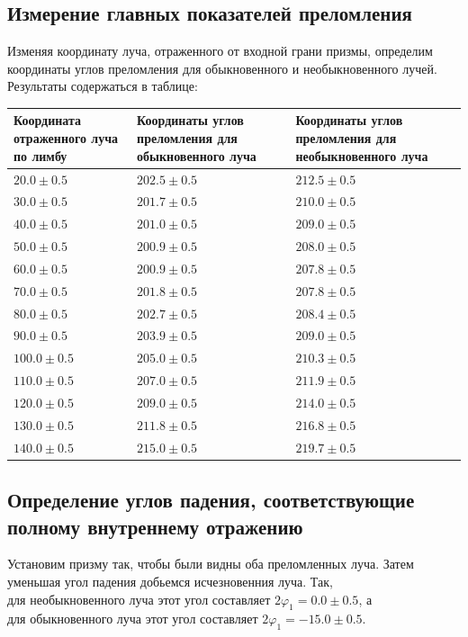 \documentclass[a4paper]{article}
\begin{document}
\subsection{Измерение главных показателей преломления}

Изменяя координату луча, отраженного от входной грани призмы, определим координаты углов преломления для обыкновенного и необыкновенного лучей. Результаты содержаться в таблице:

\begin{tabular}{|>{\raggedright\arraybackslash}p{4.5cm}|>{\raggedright\arraybackslash}p{4.5cm}|>{\raggedright\arraybackslash}p{4.5cm}|}
\hline
\textbf{Координата отраженного луча по лимбу} & \textbf{Координаты углов преломления для обыкновенного луча} & \textbf{Координаты углов преломления для необыкновенного луча} \\
\hline
$20.0 \pm 0.5$ & $202.5 \pm 0.5$ & $212.5 \pm 0.5$ \\
\hline
$30.0 \pm 0.5$ & $201.7 \pm 0.5$ & $210.0 \pm 0.5$ \\
\hline
$40.0 \pm 0.5$ & $201.0 \pm 0.5$ & $209.0 \pm 0.5$ \\
\hline
$50.0 \pm 0.5$ & $200.9 \pm 0.5$ & $208.0 \pm 0.5$ \\
\hline
$60.0 \pm 0.5$ & $200.9 \pm 0.5$ & $207.8 \pm 0.5$ \\
\hline
$70.0 \pm 0.5$ & $201.8 \pm 0.5$ & $207.8 \pm 0.5$ \\
\hline
$80.0 \pm 0.5$ & $202.7 \pm 0.5$ & $208.4 \pm 0.5$ \\
\hline
$90.0 \pm 0.5$ & $203.9 \pm 0.5$ & $209.0 \pm 0.5$ \\
\hline
$100.0 \pm 0.5$ & $205.0 \pm 0.5$ & $210.3 \pm 0.5$ \\
\hline
$110.0 \pm 0.5$ & $207.0 \pm 0.5$ & $211.9 \pm 0.5$ \\
\hline
$120.0 \pm 0.5$ & $209.0 \pm 0.5$ & $214.0 \pm 0.5$ \\
\hline
$130.0 \pm 0.5$ & $211.8 \pm 0.5$ & $216.8 \pm 0.5$ \\
\hline
$140.0 \pm 0.5$ & $215.0 \pm 0.5$ & $219.7 \pm 0.5$ \\
\hline
\end{tabular}

\subsection{Определение углов падения, соответствующие полному внутреннему отражению}

Установим призму так, чтобы были видны оба преломленных луча. Затем уменьшая угол падения добьемся исчезновенния луча. Так, $\textbf{для необыкновенного луча}$ этот угол составляет $2\varphi_1 = 0.0 \pm 0.5$, а $\textbf{для обыкновенного луча}$ этот угол составляет $2\varphi_1 = -15.0 \pm 0.5$.
\end{document}
